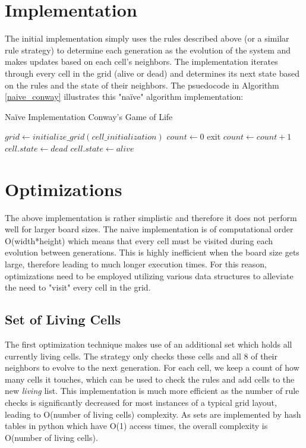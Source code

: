 \documentclass[11pt]{article}
\begin{document}
\section{Implementation}
The initial implementation simply uses the rules described above (or a similar rule strategy) to determine each generation as the evolution of the system and makes updates based on each cell's neighbors.  The implementation iterates through every cell in the grid (alive or dead) and determines its next state based on the rules and the state of their neighbors.  The psuedocode in Algorithm \ref{naive_conway} illustrates this "naïve" algorithm implementation:
\begin{algorithm}
	\caption{Naïve Implementation Conway's Game of Life}\label{naive_conway}
	\begin{algorithmic}[1]
			\State $grid\gets initialize\_grid(cell\_initialization)$
			\State $count\gets 0$
					\State exit
				\EndIf
				\State $count\gets count+1$
								\State $cell.state\gets dead$
							\EndIf
						\Else
								\State $cell.state\gets alive$
							\EndIf
						\EndIf
					\EndFor
				\EndFor
			\EndWhile\label{naiveendwhile}
		\EndProcedure
	\end{algorithmic}
\end{algorithm}

\section{Optimizations}
The above implementation is rather simplistic and therefore it does not perform well for larger board sizes.  The naive implementation is of computational order O(width*height) which means that every cell must be visited during each evolution between generations.  This is highly inefficient when the board size gets large, therefore leading to much longer execution times.  For this reason, optimizations need to be employed utilizing various data structures to alleviate the need to "visit" every cell in the grid.
\subsection*{Set of Living Cells}
The first optimization technique makes use of an additional set which holds all currently living cells.  The strategy only checks these cells and all 8 of their neighbors to evolve to the next generation.  For each cell, we keep a count of how many cells it touches, which can be used to check the rules and add cells to the new \textit{living} list.  This implementation is much more efficient as the number of rule checks is significantly decreased for most instances of a typical grid layout, leading to O(number of living cells) complexity.  As sets are implemented by hash tables in python which have O(1) access times, the overall complexity is O(number of living cells).
\end{document}
